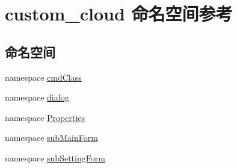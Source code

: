 \hypertarget{namespacecustom__cloud}{}\section{custom\+\_\+cloud 命名空间参考}
\label{namespacecustom__cloud}
\subsection*{命名空间}
\begin{DoxyCompactItemize}
\item 
namespace \hyperlink{namespacecustom__cloud_1_1cmd_class}{cmd\+Class}
\item 
namespace \hyperlink{namespacecustom__cloud_1_1dialog}{dialog}
\item 
namespace \hyperlink{namespacecustom__cloud_1_1_properties}{Properties}
\item 
namespace \hyperlink{namespacecustom__cloud_1_1sub_main_form}{sub\+Main\+Form}
\item 
namespace \hyperlink{namespacecustom__cloud_1_1sub_setting_form}{sub\+Setting\+Form}
\end{DoxyCompactItemize}
